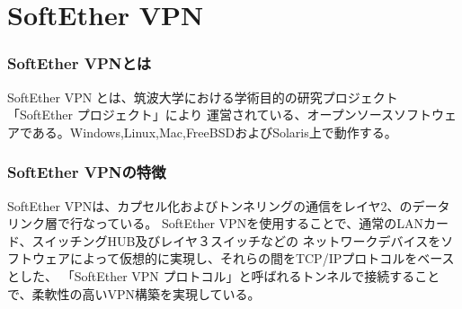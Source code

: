 \documentclass[11pt,a4j,titlepage]{jreport}
\begin{document}

\section{SoftEther VPN}\label{SoftEtherVPN}

\subsubsection*{SoftEther VPNとは}

SoftEther VPN \cite{softethervpn}とは、筑波大学における学術目的の研究プロジェクト「SoftEther プロジェクト」により
運営されている\cite{softethervpnpage}、オープンソースソフトウェアである。Windows,Linux,Mac,FreeBSDおよびSolaris上で動作する。

\subsubsection*{SoftEther VPNの特徴}
SoftEther VPNは、カプセル化およびトンネリングの通信をレイヤ2、のデータリンク層で行なっている。
SoftEther VPNを使用することで、通常のLANカード、スイッチングHUB及びレイヤ３スイッチなどの
ネットワークデバイスをソフトウェアによって仮想的に実現し、それらの間をTCP/IPプロトコルをベースとした、
「SoftEther VPN プロトコル」と呼ばれるトンネルで接続することで、柔軟性の高いVPN構築を実現している。
\end{document}
